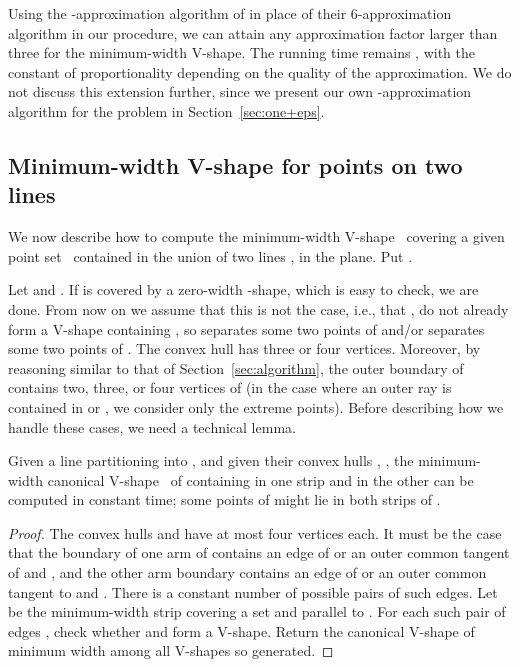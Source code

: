 \documentclass{llncs}
\begin{document}
\begin{uremark}
  Using the -approximation
  algorithm of \cite{2-line-center} in place of their 6-approximation
  algorithm in our procedure, we can attain any approximation factor
  larger than 
  three for the minimum-width V-shape.  The running time remains , with the constant of proportionality depending on the
  quality of the approximation.  We do not discuss this extension further,
  since we present our own -approximation algorithm for the
  problem in Section~\ref{sec:one+eps}.
\end{uremark}

\subsection{Minimum-width V-shape for points on two lines}
\label{sec:two-lines}

We now describe how to compute the minimum-width V-shape~ covering
a given point set~ contained in the union of two lines , 
in the plane.  Put .

Let  and .  If  is
covered by a zero-width -shape, which is easy to check, we are
done.  From now on we assume that this is not the case, i.e.,
that ,  do not already form a V-shape
containing , so  separates some two points of  and/or 
separates some two points of .  The convex hull  has
three or four vertices.  Moreover, by reasoning similar to that of
Section~\ref{sec:algorithm}, the outer boundary of  
contains two, three, or four vertices of  (in the case where 
an outer ray is contained in  or , we consider only
the extreme points).  Before describing
how we handle these cases, we need a technical lemma.

\begin{lemma}
  \label{lem:cut}
  Given a line partitioning  into ,  and given
  their convex hulls , , the minimum-width
  canonical V-shape~ of  containing  in one strip and  in
  the other can be computed in constant time; some points
  of  might lie in both strips of .
\end{lemma}

\begin{proof}
  The convex hulls  and  have at most four
  vertices each. It must be the case that the
  boundary of one arm of  contains an edge  of  or
  an outer common tangent of  and , and the
  other arm boundary contains an edge  of  or an
  outer common tangent to  and .  There is
  a constant number of possible pairs of such edges.  Let  be
  the minimum-width strip covering a set  and parallel to .  For
  each such pair of edges , check whether 
  and  form a V-shape.  Return the canonical V-shape of
  minimum width among all V-shapes so generated. \hfill 
\end{proof}
\end{document}
